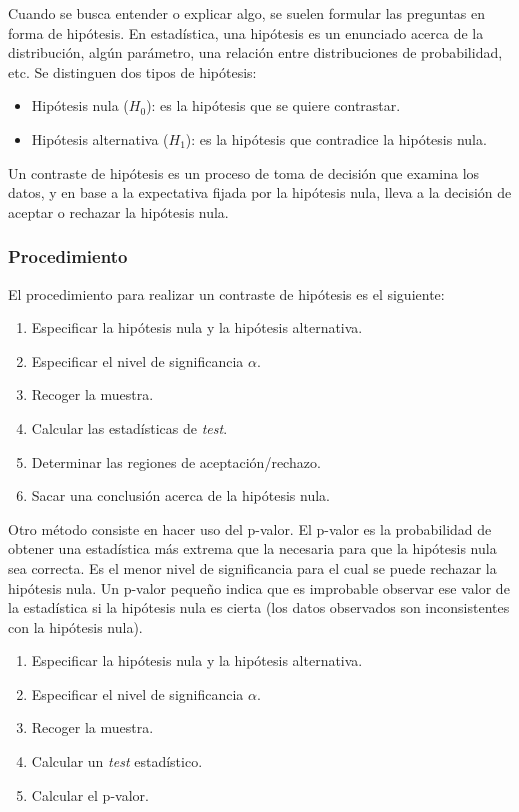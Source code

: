 Cuando se busca entender o explicar algo, se suelen formular las preguntas en forma de hipótesis. En estadística, una hipótesis es un enunciado acerca de la distribución, algún parámetro, una relación entre distribuciones de probabilidad, etc. Se distinguen dos tipos de hipótesis:
\begin{itemize}
\item Hipótesis nula ($H_0$): es la hipótesis que se quiere contrastar.
\item Hipótesis alternativa ($H_1$): es la hipótesis que contradice la hipótesis nula.
\end{itemize}

Un contraste de hipótesis es un proceso de toma de decisión que examina los datos, y en base a la expectativa fijada por la hipótesis nula, lleva a la decisión de aceptar o rechazar la hipótesis nula. \\

\subsubsection{Procedimiento}

El procedimiento para realizar un contraste de hipótesis es el siguiente:
\begin{enumerate}
\item Especificar la hipótesis nula y la hipótesis alternativa.
\item Especificar el nivel de significancia $\alpha$.
\item Recoger la muestra.
\item Calcular las estadísticas de \textit{test}.
\item Determinar las regiones de aceptación/rechazo.
\item Sacar una conclusión acerca de la hipótesis nula.
\end{enumerate}

Otro método consiste en hacer uso del p-valor. El p-valor es la probabilidad de obtener una estadística más extrema que la necesaria para que la hipótesis nula sea correcta. Es el menor nivel de significancia para el cual se puede rechazar la hipótesis nula. Un p-valor pequeño indica que es improbable observar ese valor de la estadística si la hipótesis nula es cierta (los datos observados son inconsistentes con la hipótesis nula). 
\begin{enumerate}
\item Especificar la hipótesis nula y la hipótesis alternativa.
\item Especificar el nivel de significancia $\alpha$.
\item Recoger la muestra.
\item Calcular un \textit{test} estadístico.
\item Calcular el p-valor.
\end{enumerate}

